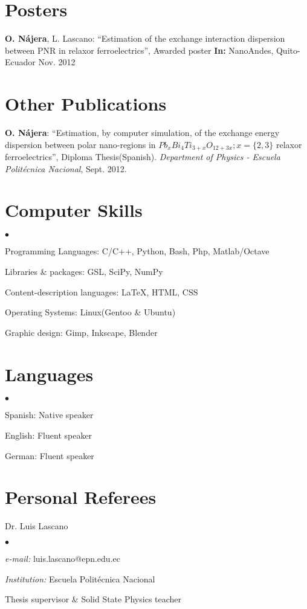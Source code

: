 \documentclass[margin,line]{res}
\newenvironment{list1}{
  \begin{list}{\ding{113}}{%
      \setlength{\itemsep}{0in}
      \setlength{\parsep}{0in} \setlength{\parskip}{0in}
      \setlength{\topsep}{0in} \setlength{\partopsep}{0in} 
      \setlength{\leftmargin}{0.17in}}}{\end{list}}
\newenvironment{list2}{
  \begin{list}{$\bullet$}{%
      \setlength{\itemsep}{0in}
      \setlength{\parsep}{0in} \setlength{\parskip}{0in}
      \setlength{\topsep}{0in} \setlength{\partopsep}{0in} 
      \setlength{\leftmargin}{0.2in}}}{\end{list}}
\begin{document}
\begin{resume}
\section{\sc Posters}
  {\bf O. Nájera}, L. Lascano: ``Estimation of the exchange interaction dispersion between PNR in
  relaxor ferroelectrics'',  Awarded poster {\bf In:} NanoAndes, Quito-Ecuador Nov. 2012

\section{\sc Other Publications}
  {\bf O. Nájera}: ``Estimation, by computer simulation, of the exchange energy dispersion between
  polar nano-regions in $Pb_xBi_4Ti_{3+x}O_{12+3x}; x=\{2,3\}$ relaxor ferroelectrics'', Diploma
  Thesis(Spanish). {\em Department of Physics - Escuela Politécnica Nacional}, Sept. 2012.

\section{\sc Computer Skills}
  \begin{list2}
    \item Programming Languages:  C/C++, Python, Bash, Php, Matlab/Octave
    \item Libraries \& packages: GSL, SciPy, NumPy
    \item Content-description languages: \LaTeX, HTML, CSS
    \item Operating Systems:  Linux(Gentoo \& Ubuntu)
    \item Graphic design: Gimp, Inkscape, Blender
  \end{list2}

\section{\sc Languages}
  \begin{list2}
    \item Spanish: Native speaker
    \item English: Fluent speaker
    \item German: Fluent speaker
  \end{list2}
  
\section{\sc Personal Referees}
 \begin{list1}
  \item[] Dr. Luis Lascano
  \begin{list2}
   \item {\it e-mail:} luis.lascano@epn.edu.ec
   \item {\it Institution:} Escuela Politécnica Nacional
   \item Thesis supervisor \& Solid State Physics teacher
  \end{list2}
 \end{list1}
 

\end{resume}
\end{document}
